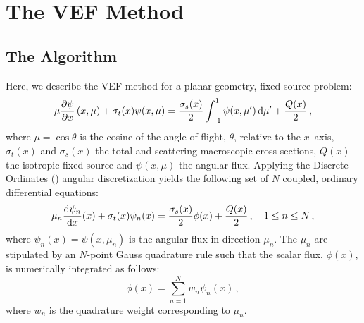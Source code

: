 
\newcommand{\rell}{^\ell} %
\newcommand{\relll}{^{\ell+1}} %
\newcommand{\rellh}{^{\ell+1/2}} %

\newcommand{\paren}[1]{\left(#1\right)} 
\newcommand{\br}[1]{\left[#1\right]}
\newcommand{\curl}[1]{\left\{#1\right\}}

\newcommand{\eddphi}[1]{\edd_{#1}\phi_{#1}}
\newcommand{\ALPHA}[2]{\frac{#1}{\sigma_{t,#2} h_{#2}}}

\section{The VEF Method}
\subsection{The Algorithm}
Here, we describe the VEF method for a planar geometry, fixed-source problem:
	\begin{equation} 
		\mu \pderiv{\psi}{x} \paren{x, \mu} + \sigma_t(x) \psi(x,\mu) = 
			\frac{\sigma_s(x)}{2} \int_{-1}^1 \psi(x,\mu') \ud \mu' + \frac{Q(x)}{2} \,,
	\end{equation}
where $\mu = \cos\theta$ is the cosine of the angle of flight, $\theta$, relative to the $x$--axis, $\sigma_t(x)$ and $\sigma_s(x)$ the total and scattering macroscopic cross sections, $Q(x)$ the isotropic fixed-source and $\psi(x, \mu)$ the angular flux. Applying the Discrete Ordinates (\SN) angular discretization yields the following set of $N$ coupled, ordinary differential equations: 
	\begin{equation} \label{eq:sn}
		\mu_n \frac{\mathop{}\!\mathrm{d} \psi_n}{\mathop{}\!\mathrm{d} x}(x) + \sigma_t(x) \psi_n(x) = 
		\frac{\sigma_s(x)}{2} \phi(x) + \frac{Q(x)}{2} \,, \quad 1 \leq n \leq N \,,
	\end{equation}
where $\psi_n(x) = \psi(x, \mu_n)$ is the angular flux in direction $\mu_n$. The $\mu_n$ are stipulated by an $N$-point Gauss quadrature rule such that the scalar flux, $\phi(x)$, is numerically integrated as follows: 
	\begin{equation} \label{eq:phiquad}
		\phi(x) = \sum_{n=1}^N w_n \psi_n(x) \,,
	\end{equation}
where $w_n$ is the quadrature weight corresponding to $\mu_n$. 


